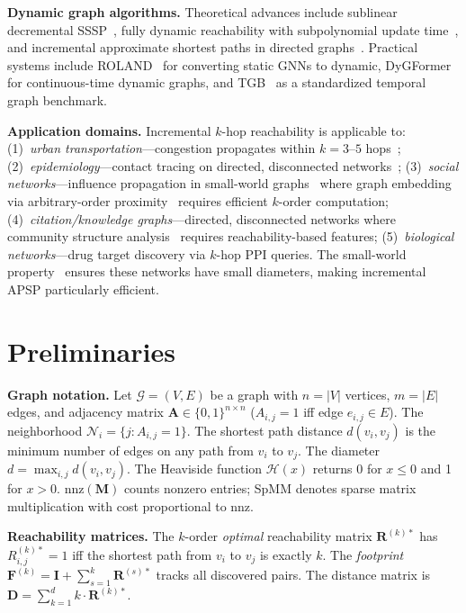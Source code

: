 \documentclass[journal]{IEEEtran}
\begin{document}
\textbf{Dynamic graph algorithms.} Theoretical advances include sublinear decremental SSSP~\cite{vdbrand2023}, fully dynamic reachability with subpolynomial update time~\cite{vdbrand2022reach}, and incremental approximate shortest paths in directed graphs~\cite{bernstein2023}. Practical systems include ROLAND~\cite{roland2022} for converting static GNNs to dynamic, DyGFormer~\cite{dygformer2023} for continuous-time dynamic graphs, and TGB~\cite{tgb2024} as a standardized temporal graph benchmark.

\textbf{Application domains.} Incremental $k$-hop reachability is applicable to: (1)~\emph{urban transportation}---congestion propagates within $k=3$--$5$ hops~\cite{kim2020traffic}; (2)~\emph{epidemiology}---contact tracing on directed, disconnected networks~\cite{kapoor2020covid}; (3)~\emph{social networks}---influence propagation in small-world graphs~\cite{backstrom2012} where graph embedding via arbitrary-order proximity~\cite{zhang2018proximity} requires efficient $k$-order computation; (4)~\emph{citation/knowledge graphs}---directed, disconnected networks where community structure analysis~\cite{newman2006modularity} requires reachability-based features; (5)~\emph{biological networks}---drug target discovery via $k$-hop PPI queries. The small-world property~\cite{barabasi1999} ensures these networks have small diameters, making incremental APSP particularly efficient.


\section{Preliminaries}

\textbf{Graph notation.} Let $\mathcal{G} = (V, E)$ be a graph with $n = |V|$ vertices, $m = |E|$ edges, and adjacency matrix $\mathbf{A} \in \{0,1\}^{n \times n}$ ($A_{i,j} = 1$ iff edge $e_{i,j} \in E$). The neighborhood $\mathcal{N}_i = \{j : A_{i,j} = 1\}$. The shortest path distance $d(v_i, v_j)$ is the minimum number of edges on any path from $v_i$ to $v_j$. The diameter $d = \max_{i,j} d(v_i, v_j)$. The Heaviside function $\mathcal{H}(x)$ returns 0 for $x \leq 0$ and 1 for $x > 0$. $\text{nnz}(\mathbf{M})$ counts nonzero entries; SpMM denotes sparse matrix multiplication with cost proportional to nnz.

\textbf{Reachability matrices.} The $k$-order \emph{optimal} reachability matrix $\mathbf{R}^{(k)*}$ has $R^{(k)*}_{i,j} = 1$ iff the shortest path from $v_i$ to $v_j$ is exactly $k$. The \emph{footprint} $\mathbf{F}^{(k)} = \mathbf{I} + \sum_{s=1}^{k} \mathbf{R}^{(s)*}$ tracks all discovered pairs. The distance matrix is $\mathbf{D} = \sum_{k=1}^{d} k \cdot \mathbf{R}^{(k)*}$.
\end{document}
